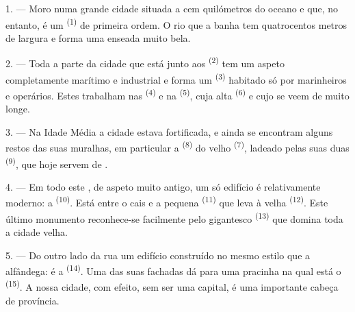 %

\VUsaut{2.0mm}
\VUsaut{3.0mm}
\VUfilet{16mm}
\VUsaut{5.6mm}
\VUsaut{1.4mm}
\VUsaut{2.2mm}

\VUsaut{3.0mm}

1. --- Moro numa grande cidade situada a cem quilómetros do oceano e que,
no entanto, é um  \textsuperscript{(1)} de primeira ordem. O rio que
a banha tem quatrocentos metros de largura e forma uma enseada muito
bela.

2. --- Toda a parte da cidade que está junto aos 
\textsuperscript{(2)} tem um aspeto completamente marítimo e industrial e forma
um  \textsuperscript{(3)} habitado só por marinheiros e
operários. Estes trabalham nas  \textsuperscript{(4)} e na
 \textsuperscript{(5)}, cuja alta 
\textsuperscript{(6)} e cujo  se veem de muito longe.

3. --- Na Idade Média a cidade estava fortificada, e ainda se encontram
alguns restos das suas muralhas, em particular a 
\textsuperscript{(8)} do velho  \textsuperscript{(7)}, ladeado
pelas suas duas  \textsuperscript{(9)}, que hoje servem de
.

4. --- Em todo este , de aspeto muito antigo, um só
edifício é relativamente moderno: a  \textsuperscript{(10)}. Está
entre o cais e a pequena  \textsuperscript{(11)} que leva à velha
 \textsuperscript{(12)}. Este último monumento reconhece-se
facilmente pelo gigantesco  \textsuperscript{(13)} que domina
toda a cidade velha.

5. --- Do outro lado da rua  um edifício construído no
mesmo estilo que a alfândega: é a  \textsuperscript{(14)}. Uma das
suas fachadas dá para uma pracinha na qual está o 
\textsuperscript{(15)}. A nossa cidade, com efeito, sem ser uma capital, é uma
importante cabeça de província.

